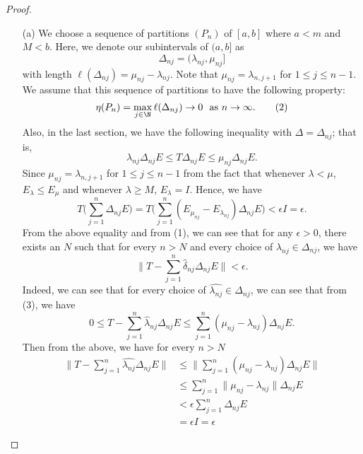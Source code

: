 \begin{proof}
\begin{enumerate}
    \item[(a)] We choose a sequence of partitions \( ({P}_{n}) \) of \( [a,b] \) where \( a  < m  \) and \( M < b \). Here, we denote our subintervals of \( (a,b] \) as
        \[  \Delta_{nj} = ({\lambda}_{nj}, {\mu}_{nj}] \tag{\( 1 \leq j \leq n  \)} \]
        with length \( \ell(\Delta_{nj}) = {\mu}_{nj} - {\lambda}_{nj} \). Note that \( \mu_{nj} = {\lambda}_{n,j+1}  \) for \( 1 \leq j \leq n - 1  \). We assume that this sequence of partitions to have the following property:
        \[  \eta({P}_{n}) = \max_{j \in \N} \ell (\Delta_{nj}) \to 0 \ \ \text{as} \ n \to \infty. \tag{2} \]
        Also, in the last section, we have the following inequality with \( \Delta = {\Delta}_{nj} \); that is, 
        \[  {\lambda}_{nj} \Delta_{nj} E \leq T \Delta_{nj} E  \leq \mu_{nj} \Delta_{nj} E. \tag{3}   \]
        Since \( \mu_{nj} = {\lambda}_{n,j+1}  \) for \( 1 \leq j \leq n - 1  \) from the fact that whenever \( \lambda <  \mu  \), \( {E}_{\lambda} \leq {E}_{\mu} \) and whenever \( \lambda \geq M  \), \( {E}_{\lambda} = I  \). Hence, we have
        \[  T \Big(  \sum_{ j=1  }^{ n  } \Delta_{nj} E  \Big) = T \Big(  \sum_{ j=1  }^{ n } ({E}_{{\mu }_{nj}} - {E}_{{\lambda}_{nj}}) \Delta_{nj} E  \Big) < \epsilon I  = \epsilon. \tag{4} \]
        From the above equality and from (1), we can see that for any \( \epsilon > 0  \), there exists an \( N  \) such that for every \( n  > N  \) and every choice of \( {\lambda}_{nj} \in \Delta_{nj} \), we have 
        \[  \|T  - \sum_{ j=1  }^{ n } \hat{\delta}_{nj} \Delta_{nj} E  \| < \epsilon.  \]
        Indeed, we can see that for every choice of \( \hat{{\lambda}_{nj}} \in \Delta_{nj} \), we can see that from (3), we have
        \[  0 \leq T - \sum_{ j=1  }^{ n } {\hat{\lambda}}_{nj} \Delta_{nj} E \leq \sum_{ j=1  }^{ n } ({\mu }_{nj} - {\lambda}_{nj}) \Delta_{nj} E.  \tag{5} \]
        Then from the above, we have for every \( n > N  \)
        \begin{align*}
            \Big\|T - \sum_{ j=1  }^{ n} \hat{\lambda_{nj}} \Delta_{nj} E \Big\| &\leq \Big\|\sum_{ j=1  }^{ n } ({\mu }_{nj } - {\lambda}_{nj } )  \Delta_{nj} E \Big\|  \\
                                                                                 &\leq \sum_{ j=1  }^{ n } \|{\mu}_{nj} - {\lambda}_{nj} \| \Delta_{nj} E \\
                                                                                 &< \epsilon \sum_{ j=1  }^{ n } \Delta_{nj} E \\
                                                                                 &= \epsilon I = \epsilon
        \end{align*}


\end{enumerate}
\end{proof}
